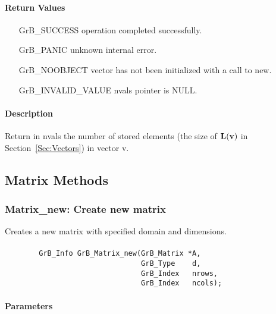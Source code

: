 \paragraph{Return Values}

\begin{itemize}[leftmargin=2.1in]
\item[{\sf GrB\_SUCCESS}]   operation completed successfully.
\item[{\sf GrB\_PANIC}]     unknown internal error.
\item[{\sf GrB\_NOOBJECT}]  vector has not been initialized with a call to {\sf new}.
\item[{\sf GrB\_INVALID\_VALUE}]    {\sf nvals} pointer is {\sf NULL}.
\end{itemize}

\paragraph{Description}

Return in {\sf nvals} the number of stored elements (the size of $\bold{L}({\bf v})$
in Section~\ref{Sec:Vectors}) in vector {\sf v}.


\subsection{Matrix Methods}

\subsubsection{{\sf Matrix\_new}: Create new matrix}

Creates a new matrix with specified domain and dimensions.

\paragraph{\syntax}

\begin{verbatim}
        GrB_Info GrB_Matrix_new(GrB_Matrix *A,
                                GrB_Type    d,
                                GrB_Index   nrows,
                                GrB_Index   ncols);
\end{verbatim}

\paragraph{Parameters}

